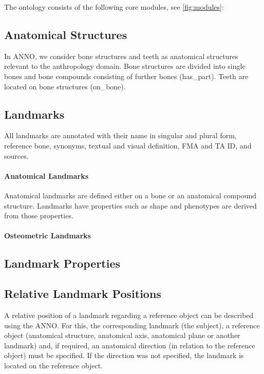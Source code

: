 \documentclass[sw]{iosart2x}
\begin{document}
The ontology consists of the following core modules, see \cref{fig:modules}:
\subsection{Anatomical Structures}\label{sec:bone}

In ANNO, we consider bone structures and teeth as anatomical structures relevant to the anthropology domain. 
Bone structures are divided into single bones and bone compounds consisting of further bones (has_part). 
Teeth are located on bone structures (on_bone). 

\subsection{Landmarks}\label{sec:landmark}
All landmarks are annotated with their name in singular and plural form, reference bone, synonyms, textual and visual definition, FMA and TA ID, and sources.


\paragraph{Anatomical Landmarks}
Anatomical landmarks are defined either on a bone or an anatomical compound structure.
Landmarks have properties such as shape and phenotypes are derived from those properties.

\paragraph{Osteometric Landmarks}

\subsection{Landmark Properties}

\subsection{Relative Landmark Positions}

A relative position of a landmark regarding a reference object can be described using the ANNO. 
For this, the corresponding landmark (the subject), a reference object 
(anatomical structure, anatomical axis, anatomical plane or another landmark) and, if required, an anatomical direction 
(in relation to the reference object) must be specified. If the direction was not specified, the landmark is located on the reference object.
\end{document}
